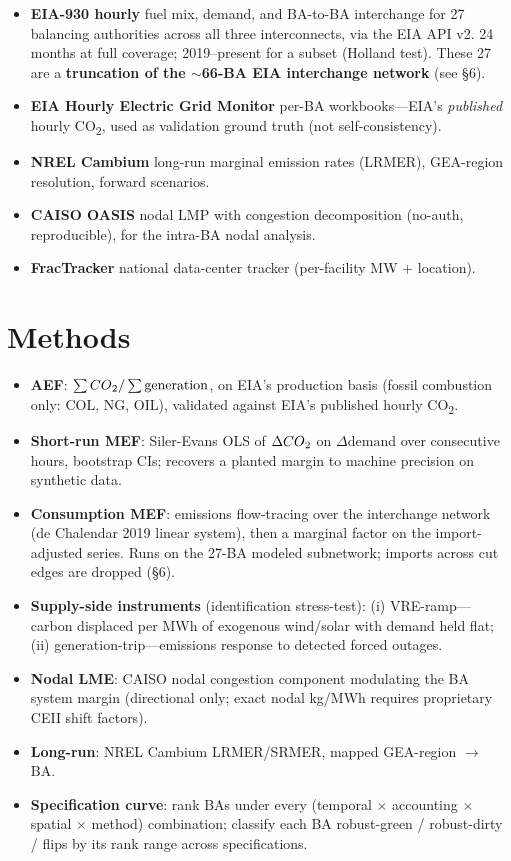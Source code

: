 \documentclass[11pt]{article}
\newcommand{\coo}{CO\textsubscript{2}}
\newcommand{\kgmwh}{kg/MWh}
\begin{document}
\begin{itemize}
\item \textbf{EIA-930 hourly} fuel mix, demand, and BA-to-BA interchange for 27
balancing authorities across all three interconnects, via the EIA API v2. 24
months at full coverage; 2019--present for a subset (Holland test). These 27 are a
\textbf{truncation of the $\sim$66-BA EIA interchange network} (see \S6).
\item \textbf{EIA Hourly Electric Grid Monitor} per-BA workbooks---EIA's
\emph{published} hourly \coo{}, used as validation ground truth (not
self-consistency).
\item \textbf{NREL Cambium} long-run marginal emission rates (LRMER), GEA-region
resolution, forward scenarios.
\item \textbf{CAISO OASIS} nodal LMP with congestion decomposition (no-auth,
reproducible), for the intra-BA nodal analysis.
\item \textbf{FracTracker} national data-center tracker (per-facility MW +
location).
\end{itemize}

\section{Methods}

\begin{itemize}
\item \textbf{AEF}: $\sum \coo / \sum \text{generation}$, on EIA's production basis
(fossil combustion only: COL, NG, OIL), validated against EIA's published hourly
\coo.
\item \textbf{Short-run MEF}: Siler-Evans OLS of $\Delta\coo$ on
$\Delta\text{demand}$ over consecutive hours, bootstrap CIs; recovers a planted
margin to machine precision on synthetic data.
\item \textbf{Consumption MEF}: emissions flow-tracing over the interchange network
(de Chalendar 2019 linear system), then a marginal factor on the import-adjusted
series. Runs on the 27-BA modeled subnetwork; imports across cut edges are dropped
(\S6).
\item \textbf{Supply-side instruments} (identification stress-test): (i)
VRE-ramp---carbon displaced per MWh of exogenous wind/solar with demand held flat;
(ii) generation-trip---emissions response to detected forced outages.
\item \textbf{Nodal LME}: CAISO nodal congestion component modulating the BA system
margin (directional only; exact nodal \kgmwh{} requires proprietary CEII shift
factors).
\item \textbf{Long-run}: NREL Cambium LRMER/SRMER, mapped GEA-region $\to$ BA.
\item \textbf{Specification curve}: rank BAs under every (temporal $\times$
accounting $\times$ spatial $\times$ method) combination; classify each BA
robust-green / robust-dirty / flips by its rank range across specifications.
\end{itemize}
\end{document}
